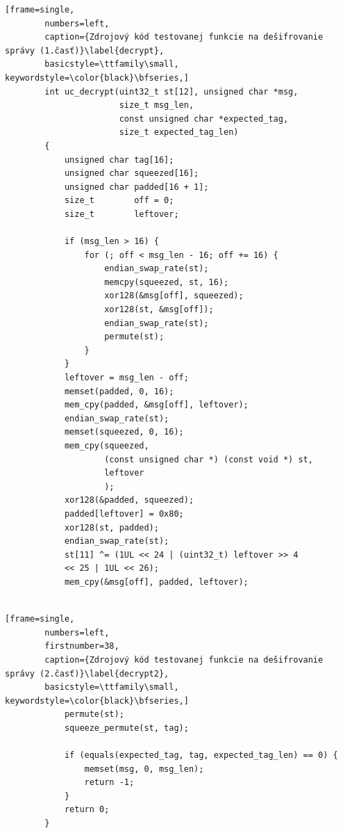 \begin{minipage}{\textwidth} 	
	\begin{lstlisting}[frame=single,
		numbers=left,
		caption={Zdrojový kód testovanej funkcie na dešifrovanie správy (1.časť)}\label{decrypt},
		basicstyle=\ttfamily\small, keywordstyle=\color{black}\bfseries,]
		int uc_decrypt(uint32_t st[12], unsigned char *msg, 
		               size_t msg_len, 
		               const unsigned char *expected_tag,
		               size_t expected_tag_len)
		{
			unsigned char tag[16];
			unsigned char squeezed[16];
			unsigned char padded[16 + 1];
			size_t        off = 0;
			size_t        leftover;
			
			if (msg_len > 16) {
				for (; off < msg_len - 16; off += 16) {
					endian_swap_rate(st);
					memcpy(squeezed, st, 16);
					xor128(&msg[off], squeezed);
					xor128(st, &msg[off]);
					endian_swap_rate(st);
					permute(st);
				}
			}
			leftover = msg_len - off;
			memset(padded, 0, 16);
			mem_cpy(padded, &msg[off], leftover);
			endian_swap_rate(st);
			memset(squeezed, 0, 16);
			mem_cpy(squeezed, 
			        (const unsigned char *) (const void *) st, 
			        leftover
			        );
		    xor128(&padded, squeezed);
			padded[leftover] = 0x80;
			xor128(st, padded);
			endian_swap_rate(st);
			st[11] ^= (1UL << 24 | (uint32_t) leftover >> 4 
			<< 25 | 1UL << 26);
			mem_cpy(&msg[off], padded, leftover);
			
	\end{lstlisting}
\end{minipage}

\begin{minipage}{\textwidth} 	
	\begin{lstlisting}[frame=single,
		numbers=left,
		firstnumber=38,
		caption={Zdrojový kód testovanej funkcie na dešifrovanie správy (2.časť)}\label{decrypt2},
		basicstyle=\ttfamily\small, keywordstyle=\color{black}\bfseries,]
			permute(st);
			squeeze_permute(st, tag);
			
			if (equals(expected_tag, tag, expected_tag_len) == 0) {
				memset(msg, 0, msg_len);
				return -1;
			}
			return 0;
		}
	\end{lstlisting}
\end{minipage}\\

